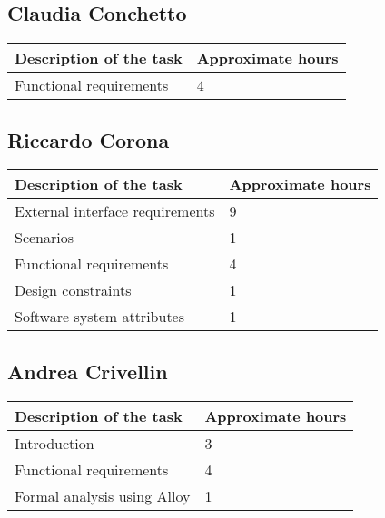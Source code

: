 
%

\subsection{Claudia Conchetto}
\begin{table}[h!]
\begin{tabular}{|l|l|}
\hline
\textbf{Description of the task} & \textbf{Approximate hours} \\ \hline
Functional requirements & 4 \\ \hline
\end{tabular}
\end{table}

\subsection{Riccardo Corona}
\begin{table}[h!]
\begin{tabular}{|l|l|}
\hline
\textbf{Description of the task} & \textbf{Approximate hours} \\ \hline
External interface requirements & 9 \\ \hline
Scenarios & 1 \\ \hline
Functional requirements & 4 \\ \hline
Design constraints & 1 \\ \hline
Software system attributes & 1 \\ \hline
\end{tabular}
\end{table}

\subsection{Andrea Crivellin}
\begin{table}[h!]
\begin{tabular}{|l|l|}
\hline
\textbf{Description of the task} & \textbf{Approximate hours} \\ \hline
Introduction & 3 \\ \hline
Functional requirements & 4 \\ \hline
Formal analysis using Alloy & 1 \\ \hline
\end{tabular}
\end{table}

%